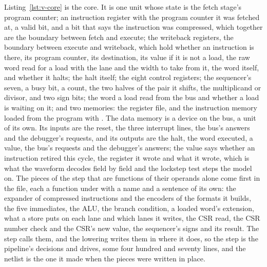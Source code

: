 \documentclass[journal,onecolumn,9pt]{IEEEtran}
\begin{document}
Listing~\ref{lst:v-core} is the core. It is one unit whose state is
the fetch stage's program counter; an instruction register with the
program counter it was fetched at, a valid bit, and a bit that says
the instruction was compressed, which together
are the boundary between fetch and execute; the writeback registers,
the boundary between execute and writeback, which hold whether an
instruction is there, its program counter, its destination, its
value if it is not a load, the raw word read for a load with the
lane and the width to take from it, the word itself, and whether it
halts; the halt itself; the eight control registers; the sequencer's
seven, a busy bit, a count, the two halves of the pair it shifts, the
multiplicand or divisor, and two sign bits; the word a load read
from the bus and whether a load is waiting on it; and two memories:
the register file, and the instruction memory loaded from the
program with . The data memory is a device on the
bus, a unit of its own. Its inputs are
the reset, the three interrupt lines, the bus's answers and the
debugger's requests, and its outputs are the halt, the word
executed, a  value, the bus's requests and the
debugger's answers; the  value says whether an instruction retired this cycle,
the register it wrote and what it wrote, which is what the waveform
decodes field by field and the lockstep test steps the model on.
The pieces of the step that are functions of their operands alone
come first in the file, each a function under \code{\#[lower]} with
a name and a sentence of its own: the expander of compressed
instructions and the encoders of the formats it builds, the five
immediates, the ALU, the
branch condition, a loaded word's extension, what a store puts on
each lane and which lanes it writes, the CSR read, the CSR number
check and the CSR's new value, the sequencer's signs and its result.
The step calls them, and the lowering writes them in where it does,
so the step is the pipeline's decisions and drives, some four
hundred and seventy lines, and the netlist is the one it made when
the pieces were written in place.
\end{document}
